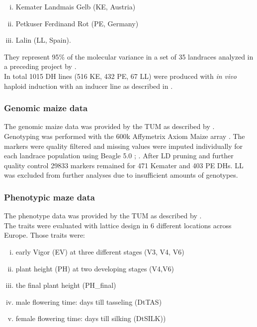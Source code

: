 \begin{enumerate}[(i)]
\item  Kemater Landmais Gelb (KE, Austria)
\item Petkuser Ferdinand Rot (PE, Germany)
\item Lalin (LL, Spain).
\end{enumerate}

They represent 95\% of the molecular variance in a set of
35 landraces analyzed in a preceding project by \cite{mayer2017there}.\\
In total 1015 DH lines (516 KE, 432 PE, 67 LL) were produced with \textit{in vivo} haploid
induction with an inducer line as described in \cite{roeber2005vivo}.


\subsubsection{Genomic maize data}
The genomic maize data was provided by the TUM as described by \cite{holker2019european}.\\
Genotyping was performed with the 600k Affymetrix\textsuperscript{\textregistered}
Axiom\textsuperscript{\textregistered} Maize array \cite{unterseer2014powerful}. The
markers were quality filtered and missing values were imputed individually for each
landrace population using Beagle 5.0 \cite{browning2007rapid};
\cite{browning2018one}. After LD pruning and further quality control 29833 markers
remained for 471 Kemater and 403 PE DHs. LL was excluded from further analyses due to
insufficient amounts of genotypes.

\subsubsection{Phenotypic maze data}
The phenotype data was provided by the TUM as described by \cite{holker2019european}. \\
The traits were evaluated with lattice design in 6 different locations across
Europe. Those traits were:

\begin{enumerate}[(i)]
\item early Vigor (EV) at three different stages (V3, V4, V6)
\item plant height (PH) at two developing stages (V4,V6)
\item the final plant height (PH\_final)
\item male flowering time: days till tasseling (DtTAS)
\item female flowering time: days till silking (DtSILK)) 
\end{enumerate}

